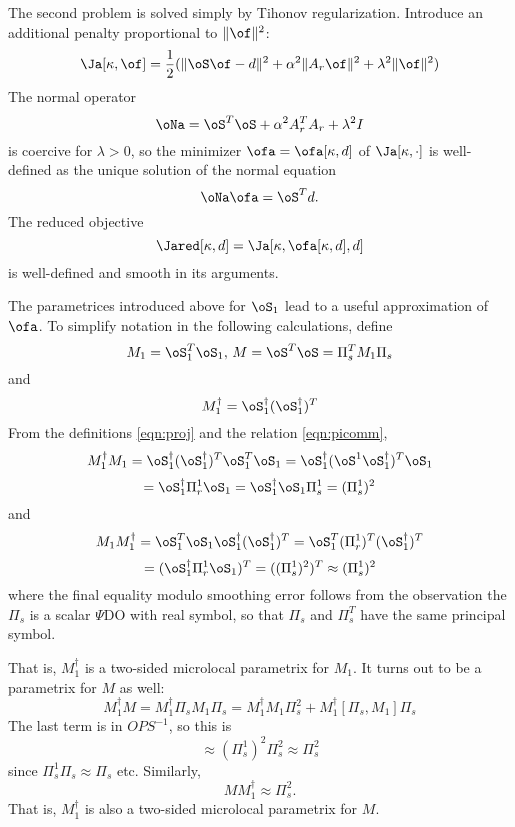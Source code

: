 The second problem is solved simply by Tihonov regularization. Introduce an additional penalty proportional to $\|\of\|^2$:
\begin{equation}
\label{eqn:jdef}
\Ja[\kappa,\of]=\frac{1}{2}(\|\oS \of - d\|^2 + \alpha^2 \|A_r\of\|^2 + \lambda^2\|\of\|^2)
\end{equation}
The normal operator 
\begin{equation}
\label{eqn:normop}
\oNa = \oS^T\oS + \alpha^2 A_r^TA_r + \lambda^2 I
\end{equation}
is coercive for $\lambda>0$, so the minimizer $\ofa=\ofa[\kappa,d]$ of $\Ja[\kappa,\cdot]$ is well-defined as the unique solution of the normal equation
\begin{equation}
\label{eqn:normal}
\oNa \ofa = \oS^Td.
\end{equation}
The reduced objective
\begin{equation}
\label{eqn:normred}
\Jared[\kappa,d] = \Ja[\kappa,\ofa[\kappa,d],d]
\end{equation}
is well-defined and smooth in its arguments.

The parametrices introduced above for $\oS_1$ lead to a useful approximation of $\ofa$. To simplify notation in the following calculations, define 
\[
M_1=\oS_1^T\oS_1,\, M=\oS^T\oS = \Pi_s^TM_1\Pi_s
\]
and
\[
M_1^{\dagger} = \oS_1^{\dagger}(\oS_1^{\dagger})^T
\]
From the definitions \ref{eqn:proj} and the relation \ref{eqn:picomm},
\[
M_1^{\dagger}M_1=\oS_1^{\dagger}(\oS_1^{\dagger})^T \oS_1^T\oS_1
=\oS_1^{\dagger}(\oS^1\oS_1^{\dagger})^T\oS_1
\]
\[
=\oS_1^{\dagger}\Pi^1_r\oS_1=\oS_1^{\dagger}\oS_1\Pi^1_s = (\Pi^1_s)^2
\]
and
\[
M_1 M_1^{\dagger}=\oS_1^T\oS_1 \oS_1^{\dagger}(\oS_1^{\dagger})^T 
=\oS_1^T(\Pi^1_r)^T(\oS_1^{\dagger})^T 
\]
\[
=(\oS_1^{\dagger}\Pi^1_r\oS_1)^T = ((\Pi^1_s)^2)^T \approx (\Pi^1_s)^2
\]
where the final equality modulo smoothing error follows from the observation the $\Pi_s$ is a scalar $\Psi$DO with real symbol, so that $\Pi_s$ and $\Pi_s^T$ have the same principal symbol.
  
That is, $M_1^{\dagger}$ is a two-sided microlocal parametrix for $M_1$. It turns out to be a parametrix for $M$ as well:
\[
M_1^{\dagger} M = M_1^{\dagger} \Pi_s M_1 \Pi_s =  M_1^{\dagger}M_1\Pi_s^2 +  M_1^{\dagger}[\Pi_s,M_1]\Pi_s
\]
The last term is in $OPS^{-1}$, so this is
\[
\approx (\Pi^1_s)^2\Pi_s^2 \approx \Pi_s^2
\]
since $\Pi^1_s\Pi_s \approx \Pi_s$ etc. Similarly,
\[
M M_1^{\dagger} \approx \Pi_s^2.
\]
That is, $M_1^{\dagger}$ is also a two-sided microlocal parametrix for $M$.

